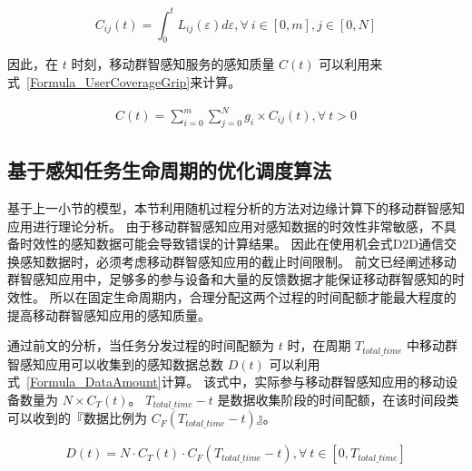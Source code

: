 \begin{equation}
  \label{Formula_UserTrace}
  C_{ij}(t) = \int_{0}^{t}L_{ij}(\varepsilon )d\varepsilon , \forall \ i \in [0,m], j \in [0,N]
\end{equation}

因此，在 $t$ 时刻，移动群智感知服务的感知质量 $C(t)$ 可以利用来式~\eqref{Formula_UserCoverageGrip}来计算。

\begin{equation}
  \label{Formula_UserCoverageGrip}
  \begin{gathered}
  C(t) = \sum^{m}_{i=0}\sum^{N}_{j=0} g_i \times C_{ij}(t), \forall \ t>0
  \end{gathered}
\end{equation}

\subsection{基于感知任务生命周期的优化调度算法}

基于上一小节的模型，本节利用随机过程分析的方法对边缘计算下的移动群智感知应用进行理论分析。
由于移动群智感知应用对感知数据的时效性非常敏感，不具备时效性的感知数据可能会导致错误的计算结果。
因此在使用机会式D2D通信交换感知数据时，必须考虑移动群智感知应用的截止时间限制。
前文已经阐述移动群智感知应用中，足够多的参与设备和大量的反馈数据才能保证移动群智感知的时效性。
所以在固定生命周期内，合理分配这两个过程的时间配额才能最大程度的提高移动群智感知应用的感知质量。

通过前文的分析，当任务分发过程的时间配额为 $t$ 时，在周期 $T_{total\_time}$ 中移动群智感知应用可以收集到的感知数据总数 $D(t)$ 可以利用式~\eqref{Formula_DataAmount}计算。
该式中，实际参与移动群智感知应用的移动设备数量为 $N\times C_T(t)$。
$T_{total\_time}-t$ 是数据收集阶段的时间配额，在该时间段类可以收到的『数据比例为 $C_F(T_{total\_time}-t)$』。

\begin{equation}
  \label{Formula_DataAmount}
  \begin{gathered}
  D(t) = N \cdot C_T(t) \cdot C_F(T_{total\_time}-t),\forall \ t \in [0, T_{total\_time}]
  \end{gathered}
\end{equation}

